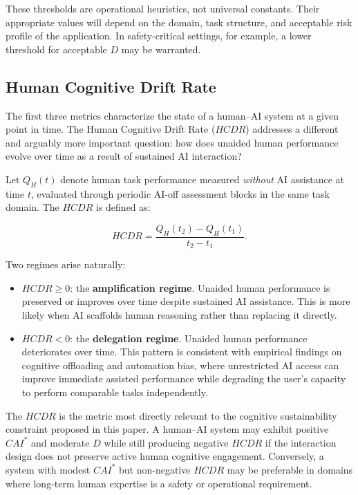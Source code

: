 \documentclass[11pt]{article}
\begin{document}
These thresholds are operational heuristics, not universal constants.
Their appropriate values will depend on the domain, task structure,
and acceptable risk profile of the application. In safety-critical
settings, for example, a lower threshold for acceptable $D$ may be
warranted.

\subsection{Human Cognitive Drift Rate}

The first three metrics characterize the state of a human--AI system
at a given point in time. The Human Cognitive Drift Rate ($HCDR$)
addresses a different and arguably more important question: how does
unaided human performance evolve over time as a result of sustained
AI interaction?

Let $Q_H(t)$ denote human task performance measured \emph{without}
AI assistance at time $t$, evaluated through periodic AI-off
assessment blocks in the same task domain. The $HCDR$ is defined as:

\begin{equation}
HCDR = \frac{Q_H(t_2) - Q_H(t_1)}{t_2 - t_1}.
\end{equation}

Two regimes arise naturally:

\begin{itemize}
\item $HCDR \geq 0$: the \textbf{amplification regime}. Unaided human
performance is preserved or improves over time despite sustained AI
assistance. This is more likely when AI scaffolds human reasoning
rather than replacing it directly.

\item $HCDR < 0$: the \textbf{delegation regime}. Unaided human
performance deteriorates over time. This pattern is consistent with
empirical findings on cognitive offloading and automation bias,
where unrestricted AI access can improve immediate assisted performance
while degrading the user's capacity to perform comparable tasks
independently.
\end{itemize}

The $HCDR$ is the metric most directly relevant to the cognitive
sustainability constraint proposed in this paper. A human--AI system
may exhibit positive $CAI^*$ and moderate $D$ while still producing
negative $HCDR$ if the interaction design does not preserve active
human cognitive engagement. Conversely, a system with modest $CAI^*$
but non-negative $HCDR$ may be preferable in domains where long-term
human expertise is a safety or operational requirement.
\end{document}
